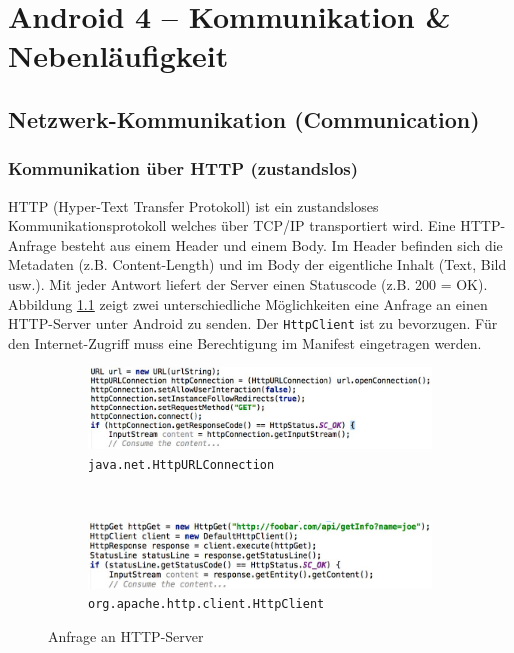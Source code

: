 \chapter{Android 4 – Kommunikation \& Nebenläufigkeit}

\section{Netzwerk-Kommunikation (Communication)}

\subsection{Kommunikation über HTTP (zustandslos)}

HTTP (Hyper-Text Transfer Protokoll) ist ein zustandsloses Kommunikationsprotokoll welches über TCP/IP transportiert wird. Eine HTTP-Anfrage besteht aus einem Header und einem Body. Im Header befinden sich die Metadaten (z.B. Content-Length) und im Body der eigentliche Inhalt (Text, Bild usw.). Mit jeder Antwort liefert der Server einen Statuscode (z.B. 200 = OK).
Abbildung \ref{fig:http-anfrage} zeigt zwei unterschiedliche Möglichkeiten eine Anfrage an einen HTTP-Server unter Android zu senden. Der \texttt{HttpClient} ist zu bevorzugen. Für den Internet-Zugriff muss eine Berechtigung im Manifest eingetragen werden.

\begin{figure}
	\centering
	\begin{subfigure}[b]{0.4\textwidth}
		\includegraphics[width=\textwidth]{fig/httpurlconnection}
		\caption{\texttt{java.net.HttpURLConnection}}
	\end{subfigure}
	~
	\begin{subfigure}[b]{0.4\textwidth}
		\includegraphics[width=\textwidth]{fig/httpclient}
		\caption{\texttt{org.apache.http.client.HttpClient}}
	\end{subfigure}
	\caption{Anfrage an HTTP-Server}
	\label{fig:http-anfrage}
\end{figure}

